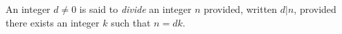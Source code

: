 \guard


\begin{defn}
\label{defn:divide}
  An integer $d\not=0$ is said to \emph{divide} an integer $n$ provided, written $d\vert n$, provided there exists an integer $k$ such that $n=dk$.
\end{defn}
